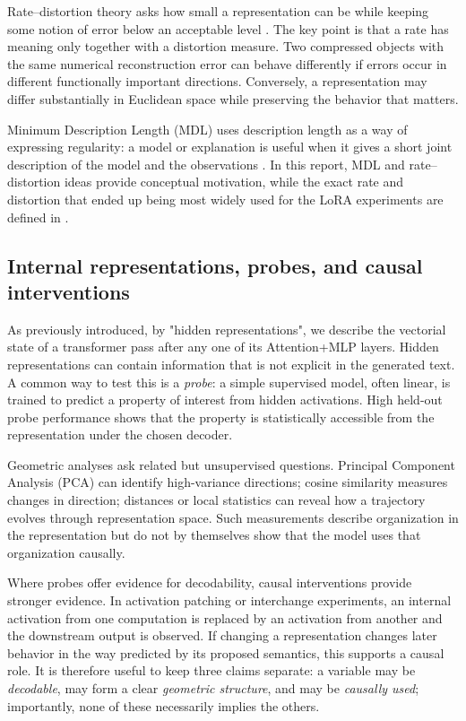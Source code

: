 Rate--distortion theory asks how small a representation can be while keeping some notion of error below an acceptable level \parencite{cover2006elements}. The key point is that a rate has meaning only together with a distortion measure. Two compressed objects with the same numerical reconstruction error can behave differently if errors occur in different functionally important directions. Conversely, a representation may differ substantially in Euclidean space while preserving the behavior that matters.

Minimum Description Length (MDL) uses description length as a way of expressing regularity: a model or explanation is useful when it gives a short joint description of the model and the observations \parencite{grunwald2019mdl}. In this report, MDL and rate--distortion ideas provide conceptual motivation, while the exact rate and distortion that ended up being most widely used for the LoRA experiments are defined in .

\subsection{Internal representations, probes, and causal interventions}

As previously introduced, by "hidden representations", we describe the vectorial state of a transformer pass after any one of its Attention+MLP layers. Hidden representations can contain information that is not explicit in the generated text. A common way to test this is a \emph{probe}: a simple supervised model, often linear, is trained to predict a property of interest from hidden activations. High held-out probe performance shows that the property is statistically accessible from the representation under the chosen decoder.

Geometric analyses ask related but unsupervised questions. Principal Component Analysis (PCA) can identify high-variance directions; cosine similarity measures changes in direction; distances or local statistics can reveal how a trajectory evolves through representation space. Such measurements describe organization in the representation but do not by themselves show that the model uses that organization causally.

Where probes offer evidence for decodability, causal interventions provide stronger evidence. In activation patching or interchange experiments, an internal activation from one computation is replaced by an activation from another and the downstream output is observed. If changing a representation changes later behavior in the way predicted by its proposed semantics, this supports a causal role. It is therefore useful to keep three claims separate: a variable may be \emph{decodable}, may form a clear \emph{geometric structure}, and may be \emph{causally used}; importantly, none of these necessarily implies the others.

